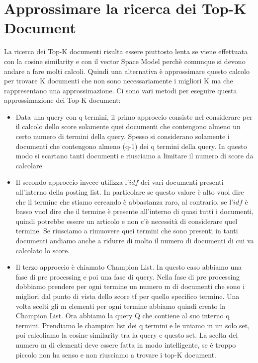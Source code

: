 \documentclass[14pt]{extreport}
\begin{document}
\section{Approssimare la ricerca dei Top-K Document}

La ricerca dei Top-K documenti risulta essere piuttosto lenta se viene effettuata con la cosine similarity e con il vector Space Model perchè comunque si devono andare a fare molti calcoli.
Quindi una alternativa è approssimare questo calcolo per trovare K documenti che non sono necessariamente i migliori K ma che rappresentano una approssimazione.
Ci sono vari metodi per eseguire questa approssimazione dei Top-K document:

\begin{itemize}
    \item Data una query con q termini, il primo approccio consiste nel considerare per il calcolo dello score solamente quei documenti che contengono almeno un certo numero di termini della query. Spesso si considerano solamente i documenti che contengono almeno (q-1) dei q termini della query.
    In questo modo si scartano tanti documenti e riusciamo a limitare il numero di score da calcolare
    \item Il secondo approccio invece utilizza l'$idf$ dei vari documenti presenti all'interno della posting list. In particolare se questo valore è alto vuol dire che il termine che stiamo cercando è abbastanza raro, al contrario, se l'$idf$ è basso vuol dire che il termine è presente all'interno di quasi tutti i documenti, quindi potrebbe essere un articolo e non c'è necessità di considerare quel termine. Se riusciamo a rimuovere quei termini che sono presenti in tanti documenti andiamo anche a ridurre di molto il numero di documenti di cui va calcolato lo score.
    \item Il terzo approccio è chiamato Champion List. In questo caso abbiamo una fase di pre processing e poi una fase di query. Nella fase di pre processing dobbiamo prendere per ogni termine un numero m di documenti che sono i migliori dal punto di vista dello score tf per quello specifico termine. 
    Una volta scelti gli m elementi per ogni termine abbiamo quindi creato la Champion List. 
    Ora abbiamo la query Q che contiene al suo interno q termini. 
    Prendiamo le champion list dei q termini e le uniamo in un solo set, poi calcoliamo la cosine similarity tra la query e questo set.
    La scelta del numero m di elementi deve essere fatta in modo intelligente, se è troppo piccolo non ha senso e non riusciamo a trovare i top-K document. 

\end{itemize}
\end{document}

